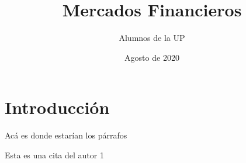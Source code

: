 \documentclass{article}
\title{Mercados Financieros}
\author{Alumnos de la UP}
\date{Agosto de 2020}
\begin{document}
\maketitle

\section{Introducción}
Acá es donde estarían los párrafos

Esta es una cita del autor 1 \cite{Said1984}



\end{document}
